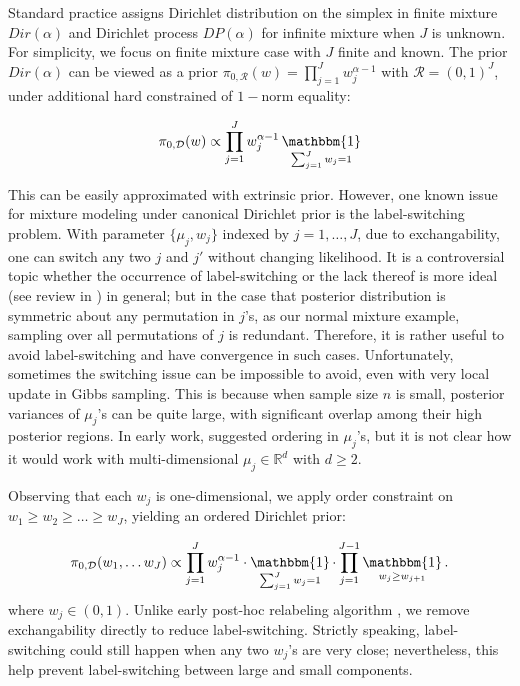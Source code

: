 \documentclass[10pt]{article}
\newcommand{\bb}[1]{\mathbb{#1}}
\newcommand{\mc}[1]{\mathcal{#1}}
\DeclareMathOperator{\1}{\mathbbm{1}}
\begin{document}
Standard practice assigns Dirichlet distribution on the simplex in finite mixture $Dir(\alpha)$ and Dirichlet process $DP(\alpha)$ for infinite mixture when $J$ is unknown. For simplicity, we focus on finite mixture case with $J$ finite and known. The prior $Dir(\alpha)$ can be viewed as a prior $\pi_{0, \mc R}(w) = \prod_{j=1}^J w_j^{\alpha-1}$ with $\mc R = (0,1)^J$, under additional hard constrained of $1-$norm equality:

\begin{equation}
\begin{aligned}
\label{canonical_dp_prior}
\pi_{0, \mc D}(w) \propto \prod_{j=1}^J w_j^{\alpha-1} \1_{\sum_{j=1}^J w_j=1}
\end{aligned}
\end{equation}

This can be easily approximated with extrinsic prior. However, one known issue for mixture modeling under canonical Dirichlet prior is the label-switching problem. With parameter $\{\mu_j,w_j\}$ indexed by $j=1,\ldots,J$, due to exchangability, one can switch any two $j$ and $j'$ without changing likelihood. It is a controversial topic whether the occurrence of label-switching or the lack thereof is more ideal (see review in \cite{jasra2005markov}) in general; but in the case that posterior distribution is symmetric about any permutation in $j$'s, as our normal mixture example, sampling over all permutations of $j$ is redundant. Therefore, it is rather useful to avoid label-switching and have convergence in such cases. Unfortunately, sometimes the switching issue can be impossible to avoid, even with very local update in Gibbs sampling. This is because when sample size $n$ is small, posterior variances of $\mu_j$'s can be quite large, with significant overlap among their high posterior regions. In early work, \cite{diebolt1994estimation} suggested ordering in $\mu_j$'s, but it is not clear how it would work with multi-dimensional $\mu_j\in \bb R^d$ with $d\ge 2$.

Observing that each $w_j$ is one-dimensional, we apply order constraint on $w_1 \ge w_2 \ge \ldots \ge w_J$, yielding an ordered Dirichlet prior:

 \begin{equation}
\begin{aligned}
\label{ordered_dp_prior}
\pi_{0, \mc D}(w_1,\ldots w_J) \propto \prod_{j=1}^J w_j^{\alpha-1} \cdot \1_{\sum_{j=1}^J w_j=1} \cdot  \prod_{j=1}^{J-1}\1_{w_j \ge w_{j+1}}.
\end{aligned}
\end{equation}
where $w_j\in (0,1)$. Unlike early post-hoc relabeling algorithm \citep{stephens2000dealing}, we remove exchangability directly to reduce label-switching. Strictly speaking, label-switching could still happen when any two $w_j$'s are very close; nevertheless, this help prevent label-switching between large and small components.
\end{document}
